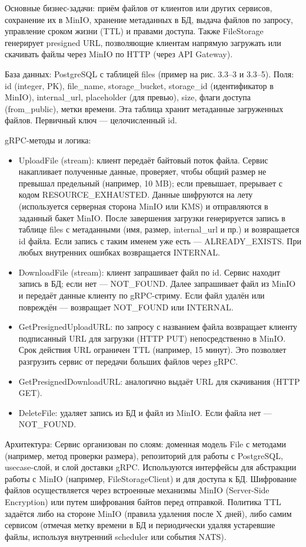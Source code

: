 Основные бизнес-задачи: приём файлов от клиентов или других сервисов, сохранение их в MinIO, хранение метаданных в БД, выдача файлов по запросу, управление сроком жизни (TTL) и правами доступа. Также FileStorage генерирует presigned URL, позволяющие клиентам напрямую загружать или скачивать файлы через MinIO по HTTP (через API Gateway).

База данных: PostgreSQL с таблицей files (пример на рис. 3.3–3 и 3.3–5). Поля: id (integer, PK), file\_name, storage\_bucket, storage\_id (идентификатор в MinIO), internal\_url, placeholder (для превью), size, флаги доступа (from\_public), метки времени. Эта таблица хранит метаданные загруженных файлов. Первичный ключ — целочисленный id.

gRPC-методы и логика:
\begin{itemize}
    \item UploadFile (stream): клиент передаёт байтовый поток файла. Сервис накапливает полученные данные, проверяет, чтобы общий размер не превышал предельный (например, 10 MB); если превышает, прерывает с кодом RESOURCE\_EXHAUSTED. Данные шифруются на лету (используется серверная сторона MinIO или KMS) и отправляются в заданный бакет MinIO. После завершения загрузки генерируется запись в таблице files с метаданными (имя, размер, internal\_url и пр.) и возвращается id файла. Если запись с таким именем уже есть — ALREADY\_EXISTS. При любых внутренних ошибках возвращается INTERNAL.
    \item DownloadFile (stream): клиент запрашивает файл по id. Сервис находит запись в БД; если нет — NOT\_FOUND. Далее запрашивает файл из MinIO и передаёт данные клиенту по gRPC-стриму. Если файл удалён или повреждён — возвращает NOT\_FOUND или INTERNAL.
    \item GetPresignedUploadURL: по запросу с названием файла возвращает клиенту подписанный URL для загрузки (HTTP PUT) непосредственно в MinIO. Срок действия URL ограничен TTL (например, 15 минут). Это позволяет разгрузить сервис от передачи больших файлов через gRPC.
    \item GetPresignedDownloadURL: аналогично выдаёт URL для скачивания (HTTP GET).
    \item DeleteFile: удаляет запись из БД и файл из MinIO. Если файла нет — NOT\_FOUND.
\end{itemize}
\noindent Архитектура: Сервис организован по слоям: доменная модель File с методами (например, метод проверки размера), репозиторий для работы с PostgreSQL, usecase-слой, и слой доставки gRPC. Используются интерфейсы для абстракции работы с MinIO (например, FileStorageClient) и для доступа к БД. Шифрование файлов осуществляется через встроенные механизмы MinIO (Server-Side Encryption) или путем шифрования байтов перед отправкой. Политика TTL задаётся либо на стороне MinIO (правила удаления после X дней), либо самим сервисом (отмечая метку времени в БД и периодически удаляя устаревшие файлы, используя внутренний scheduler или события NATS).

